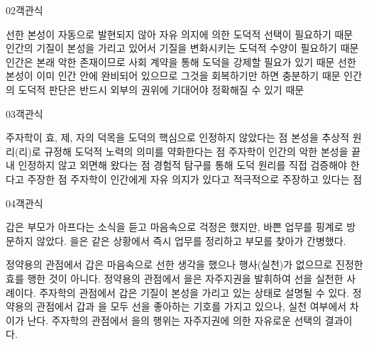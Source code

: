 \documentclass[fs85,seriesWit]{korfarm-base}
\begin{document}
\begin{kfQBlock}{02}{객관식}
\begin{kfChoices}
\kfChoice 선한 본성이 자동으로 발현되지 않아 자유 의지에 의한 도덕적 선택이 필요하기 때문
\kfChoice 인간의 기질이 본성을 가리고 있어서 기질을 변화시키는 도덕적 수양이 필요하기 때문
\kfChoice 인간은 본래 악한 존재이므로 사회 계약을 통해 도덕을 강제할 필요가 있기 때문
\kfChoice 선한 본성이 이미 인간 안에 완비되어 있으므로 그것을 회복하기만 하면 충분하기 때문
\kfChoice 인간의 도덕적 판단은 반드시 외부의 권위에 기대어야 정확해질 수 있기 때문
\end{kfChoices}
\end{kfQBlock}

\begin{kfQBlock}{03}{객관식}
\begin{kfChoices}
\kfChoice 주자학이 효, 제, 자의 덕목을 도덕의 핵심으로 인정하지 않았다는 점
\kfChoice 본성을 추상적 원리(리)로 규정해 도덕적 노력의 의미를 약화한다는 점
\kfChoice 주자학이 인간의 악한 본성을 끝내 인정하지 않고 외면해 왔다는 점
\kfChoice 경험적 탐구를 통해 도덕 원리를 직접 검증해야 한다고 주장한 점
\kfChoice 주자학이 인간에게 자유 의지가 있다고 적극적으로 주장하고 있다는 점
\end{kfChoices}
\end{kfQBlock}

\begin{kfQBlock}{04}{객관식}
\begin{kfEvidence}갑은 부모가 아프다는 소식을 듣고 마음속으로 걱정은 했지만, 바쁜 업무를 핑계로 방문하지 않았다. 을은 같은 상황에서 즉시 업무를 정리하고 부모를 찾아가 간병했다.\end{kfEvidence}
\begin{kfChoices}
\kfChoice 정약용의 관점에서 갑은 마음속으로 선한 생각을 했으나 행사(실천)가 없으므로 진정한 효를 행한 것이 아니다.
\kfChoice 정약용의 관점에서 을은 자주지권을 발휘하여 선을 실천한 사례이다.
\kfChoice 주자학의 관점에서 갑은 기질이 본성을 가리고 있는 상태로 설명될 수 있다.
\kfChoice 정약용의 관점에서 갑과 을 모두 선을 좋아하는 기호를 가지고 있으나, 실천 여부에서 차이가 난다.
\kfChoice 주자학의 관점에서 을의 행위는 자주지권에 의한 자유로운 선택의 결과이다.
\end{kfChoices}
\end{kfQBlock}
\end{document}
